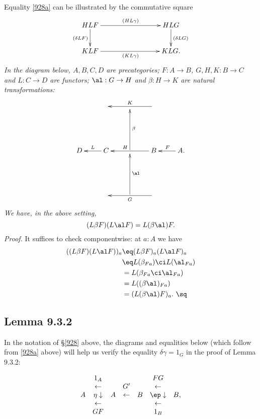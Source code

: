\documentclass[12pt]{article}
\begin{document}
Equality \eqref{928a} can be illustrated by the commutative square 
$$
\xymatrix{
HLF\ar[rrr]^{(HL\gamma)}\ar[d]_{(\delta LF)}&&&HLG\ar[d]^{(\delta LG)}\\ 
KLF\ar[rrr]_{(KL\gamma)}&&&KLG.}
$$ 
 \emph{In the diagram below, $A,B,C,D$ are precategories; $F:A\to B$, $G,H,K:B\to C$ and $L:C\to D$ are functors; $\al:G\to H$ and $\beta:H\to K$ are natural transformations:
$$
\xymatrix{
&&&\ar[ll]_K\\ \\
D&C\ar[l]_L&\ar[uu]_\beta&B\ar[ll]_(.6)H&A.\ar[l]_F\\ \\
&&\ar[uu]_\al&\ar[ll]^G}
$$ 
We have, in the above setting,}
\begin{equation}\label{928b}
(L\beta F)(L\al F)=L(\beta\al)F.
\end{equation}
\emph{Proof.} It suffices to check componentwise: at $a:A$ we have
\begin{align*}
((L\beta F)(L\al F))_a
&\eq(L\beta F)_a(L\al F)_a\\
&\eq L(\beta_{Fa})\ci L(\al_{Fa})\\
&=L(\beta_{Fa}\ci\al_{Fa})\\
&=L((\beta\al)_{Fa})\\ 
&=(L(\beta\al)F)_a.\ \sq
\end{align*}


\newpage

\subsection{Lemma 9.3.2}\label{932}

In the notation of \S\ref{928} above, the diagrams and equalities below (which follow from \eqref{928a} above) will help us verify the equality $\delta\gamma=1_G$ in the proof of Lemma 9.3.2:


$$
\begin{array}{ccccccc}
&1_A&&&&FG\\
&\leftarrow&&G'&&\leftarrow\\
A&\eta\downarrow&A&\leftarrow&B&\ep\downarrow&B,\\
&\leftarrow&&&&\leftarrow\\
&GF&&&&1_B
\end{array}
$$ 
\end{document}
